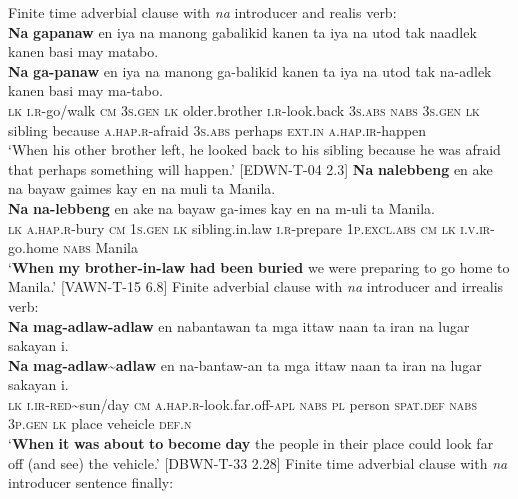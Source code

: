 \ea
Finite time adverbial clause with \textit{na} introducer and realis verb: \\
\textbf{Na}  \textbf{gapanaw}  en  iya  na  manong  gabalikid  kanen  ta iya  na  utod  tak  naadlek  kanen  basi  may  matabo. \smallskip\\
\gll \textbf{Na}  \textbf{ga-panaw}  en  iya  na  manong  ga-balikid  kanen  ta iya  na  utod  tak  na-adlek  kanen  basi  may  ma-tabo. \\
\textsc{lk}  \textsc{i.r}-go/walk  \textsc{cm}  3\textsc{s.gen}  \textsc{lk}  older.brother  \textsc{i.r}-look.back  3\textsc{s.abs}  \textsc{nabs}
3\textsc{s.gen}  \textsc{lk}  sibling  because  \textsc{a.hap.r}-afraid  3\textsc{s.abs}  perhaps  \textsc{ext.in}  \textsc{a.hap.ir}-happen \\
\glt `When his other brother left, he looked back to his sibling because he was afraid that perhaps something will happen.’ [EDWN-T-04 2.3]
\z
\ea
\textbf{Na}  \textbf{nalebbeng}  en  ake  na  bayaw  gaimes  kay en  na  muli  ta  Manila. \smallskip\\
\gll \textbf{Na}  \textbf{na-lebbeng}  en  ake  na  bayaw  ga-imes  kay en  na  m-uli  ta  Manila. \\
\textsc{lk}  \textsc{a.hap.r}-bury  \textsc{cm}  1\textsc{s.gen}  \textsc{lk}  sibling.in.law  \textsc{i.r}-prepare  1\textsc{p.excl.abs}
\textsc{cm}  \textsc{lk}  \textsc{i.v.ir}-go.home  \textsc{nabs}  Manila \\
\glt `\textbf{When} \textbf{my} \textbf{brother-in-law} \textbf{had} \textbf{been} \textbf{buried} we were preparing to go home to Manila.’ [VAWN-T-15  6.8]
\z
\ea
Finite adverbial clause with \textit{na} introducer and irrealis verb: \\
\textbf{Na}  \textbf{mag-adlaw-adlaw}  en  nabantawan  ta  mga  ittaw naan  ta  iran  na  lugar  sakayan  i. \smallskip\\
\gll \textbf{Na}  \textbf{mag-adlaw\sim{}adlaw}  en  na-bantaw-an  ta  mga  ittaw naan  ta  iran  na  lugar  sakayan  i. \\
\textsc{lk}  \textsc{i.ir-red}\sim{}sun/day  \textsc{cm}  \textsc{a.hap.r-}look.far.off\textsc{-apl}  \textsc{nabs}  \textsc{pl}  person
\textsc{spat.def}  \textsc{nabs}  3\textsc{p.gen}  \textsc{lk}  place  veheicle  \textsc{def.n} \\
\glt `\textbf{When} \textbf{it} \textbf{was} \textbf{about} \textbf{to} \textbf{become} \textbf{day} the people in their place  could look far off (and see) the vehicle.’ [DBWN-T-33 2.28]
\z
\ea
Finite time adverbial clause with \textit{na} introducer sentence finally: \\
